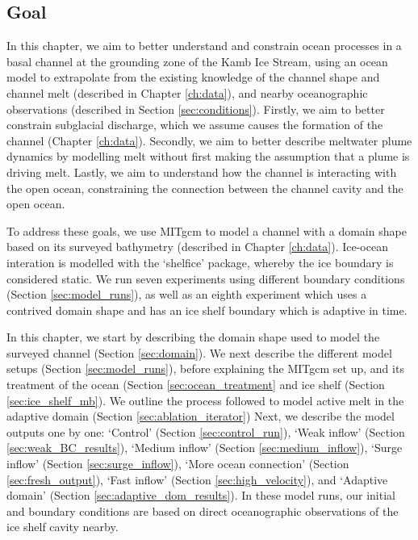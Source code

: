 \subsection{ Goal}
In this chapter, we aim to better understand and constrain ocean processes in a basal channel at the grounding zone of the Kamb Ice Stream, using an ocean model to extrapolate from the existing knowledge of the channel shape and channel melt (described in Chapter \ref{ch:data}), and nearby oceanographic observations (described in Section \ref{sec:conditions}).  Firstly, we aim to better constrain subglacial discharge, which we assume causes the formation of the channel (Chapter \ref{ch:data}). Secondly, we aim to better describe meltwater plume dynamics by modelling melt without first making the assumption that a plume is driving melt. Lastly, we aim to understand how the channel is interacting with the open ocean, constraining the connection between the channel cavity and the open ocean. 

To address these goals, we use MITgcm to model a channel with a domain shape based on its surveyed bathymetry (described in Chapter \ref{ch:data}). 
Ice-ocean interation is modelled with the `shelfice' package, whereby the ice boundary is considered static. We run seven experiments using different boundary conditions (Section \ref{sec:model_runs}), as well as an eighth experiment which uses a contrived domain shape and has an ice shelf boundary which is adaptive in time.


In this chapter, we start by describing the domain shape used to model the surveyed channel  (Section \ref{sec:domain}). We next describe the different model setups (Section \ref{sec:model_runs}), before explaining the MITgcm set up, and its treatment of the ocean (Section \ref{sec:ocean_treatment} and ice shelf (Section \ref{sec:ice_shelf_mb}). We outline the process followed to model active melt in the adaptive domain (Section  \ref{sec:ablation_iterator}) Next, we describe the model outputs one by one: `Control' (Section \ref{sec:control_run}), `Weak inflow' (Section \ref{sec:weak_BC_results}), `Medium inflow' (Section \ref{sec:medium_inflow}), `Surge inflow' (Section \ref{sec:surge_inflow}), `More ocean connection' (Section \ref{sec:fresh_output}), `Fast inflow' (Section \ref{sec:high_velocity}), and `Adaptive domain' (Section \ref{sec:adaptive_dom_results}).
In these model runs, our initial and boundary conditions are based on direct oceanographic observations of the ice shelf cavity nearby.

